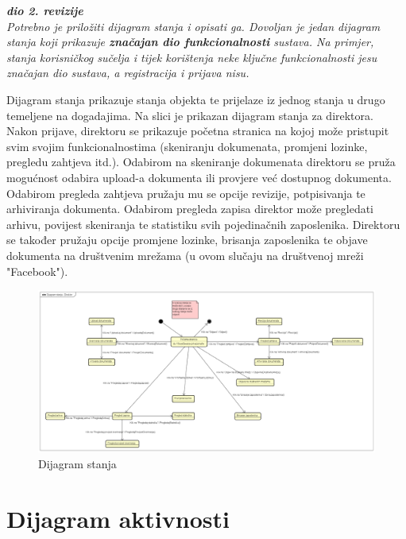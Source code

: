 			
			\textbf{\textit{dio 2. revizije}}\\
			
			\textit{Potrebno je priložiti dijagram stanja i opisati ga. Dovoljan je jedan dijagram stanja koji prikazuje \textbf{značajan dio funkcionalnosti} sustava. Na primjer, stanja korisničkog sučelja i tijek korištenja neke ključne funkcionalnosti jesu značajan dio sustava, a registracija i prijava nisu. }
			
			Dijagram stanja prikazuje stanja objekta te prijelaze iz jednog stanja u drugo temeljene na dogadajima. Na slici je prikazan dijagram stanja za direktora. Nakon prijave, direktoru se prikazuje početna stranica na kojoj može pristupit svim svojim funkcionalnostima (skeniranju dokumenata, promjeni lozinke, pregledu zahtjeva itd.). Odabirom na skeniranje dokumenata direktoru se pruža mogućnost odabira upload-a dokumenta ili provjere već dostupnog dokumenta. Odabirom pregleda zahtjeva pružaju mu se opcije revizije, potpisivanja te arhiviranja dokumenta. Odabirom pregleda zapisa direktor može pregledati arhivu, povijest skeniranja te statistiku svih pojedinačnih zaposlenika. Direktoru se također pružaju opcije promjene lozinke, brisanja zaposlenika te objave dokumenta na društvenim mrežama (u ovom slučaju na društvenoj mreži "Facebook").
			
			\begin{figure}[H]
				\includegraphics[scale=0.5]{slike/dijagram_stanja_direktor.png} %
				\centering
				\caption{Dijagram stanja}
				\label{fig:promjene}
			\end{figure}

			\eject 
		
		\section{Dijagram aktivnosti}
			
